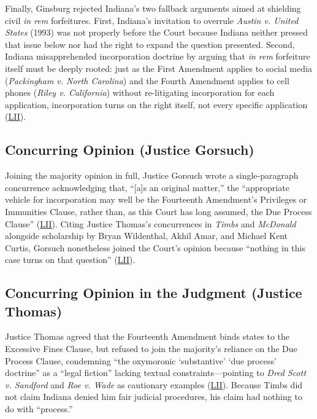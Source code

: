 \documentclass[12pt]{article}
\begin{document}
Finally, Ginsburg rejected Indiana's two fallback arguments aimed at shielding civil \textit{in rem} forfeitures. First, Indiana's invitation to overrule \textit{Austin v. United States} (1993) was not properly before the Court because Indiana neither pressed that issue below nor had the right to expand the question presented. Second, Indiana misapprehended incorporation doctrine by arguing that \textit{in rem} forfeiture itself must be deeply rooted: just as the First Amendment applies to social media (\textit{Packingham v. North Carolina}) and the Fourth Amendment applies to cell phones (\textit{Riley v. California}) without re-litigating incorporation for each application, incorporation turns on the right itself, not every specific application (\href{https://www.law.cornell.edu/supremecourt/text/17-1091}{LII}).

\subsection{Concurring Opinion (Justice Gorsuch)}

Joining the majority opinion in full, Justice Gorsuch wrote a single-paragraph concurrence acknowledging that, ``[a]s an original matter,'' the ``appropriate vehicle for incorporation may well be the Fourteenth Amendment's Privileges or Immunities Clause, rather than, as this Court has long assumed, the Due Process Clause'' (\href{https://www.law.cornell.edu/supremecourt/text/17-1091}{LII}). Citing Justice Thomas's concurrences in \textit{Timbs} and \textit{McDonald} alongside scholarship by Bryan Wildenthal, Akhil Amar, and Michael Kent Curtis, Gorsuch nonetheless joined the Court's opinion because ``nothing in this case turns on that question'' (\href{https://www.law.cornell.edu/supremecourt/text/17-1091}{LII}).

\subsection{Concurring Opinion in the Judgment (Justice Thomas)}

Justice Thomas agreed that the Fourteenth Amendment binds states to the Excessive Fines Clause, but refused to join the majority's reliance on the Due Process Clause, condemning ``the oxymoronic `substantive' `due process' doctrine'' as a ``legal fiction'' lacking textual constraints---pointing to \textit{Dred Scott v. Sandford} and \textit{Roe v. Wade} as cautionary examples (\href{https://www.law.cornell.edu/supremecourt/text/17-1091}{LII}). Because Timbs did not claim Indiana denied him fair judicial procedures, his claim had nothing to do with ``process.''
\end{document}
